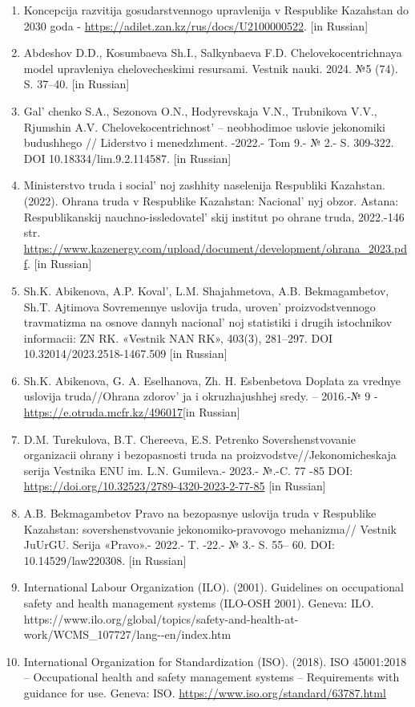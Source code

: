 \begin{enumerate}
\def\labelenumi{\arabic{enumi}.}
\item
  Koncepcija razvitija gosudarstvennogo upravlenija v Respublike
  Kazahstan do 2030 goda -
  \url{https://adilet.zan.kz/rus/docs/U2100000522}. {[}in Russian{]}
\item
  Abdeshov D.D., Kosumbaeva Sh.I., Salkynbaeva F.D.
  Chelovekocentrichnaya model upravleniya chelovecheskimi resursami.
  Vestnik nauki. 2024. №5 (74). S. 37--40. {[}in Russian{]}
\item
  Gal' chenko S.A., Sezonova O.N., Hodyrevskaja V.N.,
  Trubnikova V.V., Rjumshin A.V. Chelovekocentrichnost'{}
  -- neobhodimoe uslovie jekonomiki budushhego // Liderstvo i
  menedzhment. -2022.- Tom 9.- № 2.- S. 309-322. DOI
  10.18334/lim.9.2.114587. {[}in Russian{]}
\item
  Ministerstvo truda i social' noj zashhity naselenija
  Respubliki Kazahstan. (2022). Ohrana truda v Respublike Kazahstan:
  Nacional' nyj obzor. Astana: Respublikanskij
  nauchno-issledovatel' skij institut po ohrane truda,
  2022.-146 str.
  \url{https://www.kazenergy.com/upload/document/development/ohrana_2023.pdf}.
  {[}in Russian{]}
\item
  Sh.K. Abikenova, A.P. Koval', L.M. Shajahmetova, A.B.
  Bekmagambetov, Sh.T. Ajtimova Sovremennye uslovija truda,
  uroven'{} proizvodstvennogo travmatizma na osnove
  dannyh nacional' noj statistiki i drugih istochnikov
  informacii: ZN RK. «Vestnik NAN RK», 403(3), 281--297. DOI
  10.32014/2023.2518-1467.509 {[}in Russian{]}
\item
  Sh.K. Abikenova, G. A. Eselhanova, Zh. H. Esbenbetova Doplata za
  vrednye uslovija truda//Ohrana zdorov' ja i
  okruzhajushhej sredy. -- 2016.-№ 9 -
  \url{https://e.otruda.mcfr.kz/496017}{[}in Russian{]}
\item
  D.M. Turekulova, B.T. Chereeva, E.S. Petrenko Sovershenstvovanie
  organizacii ohrany i bezopasnosti truda na
  proizvodstve//Jekonomicheskaja serija Vestnika ENU im. L.N. Gumileva.-
  2023.- №.-C. 77 -85 DOI:
  \url{https://doi.org/10.32523/2789-4320-2023-2-77-85} {[}in Russian{]}
\item
  A.B. Bekmagambetov Pravo na bezopasnye uslovija truda v Respublike
  Kazahstan: sovershenstvovanie jekonomiko-pravovogo mehanizma// Vestnik
  JuUrGU. Serija «Pravo».- 2022.- T. -22.- № 3.- S. 55-- 60. DOI:
  10.14529/law220308. {[}in Russian{]}
\item
  International Labour Organization (ILO). (2001). Guidelines on
  occupational safety and health management systems (ILO-OSH 2001).
  Geneva: ILO.
  https://www.ilo.org/global/topics/safety-and-health-at-work/WCMS\_107727/lang-\/-en/index.htm
\item
  International Organization for Standardization (ISO). (2018). ISO
  45001:2018 -- Occupational health and safety management systems --
  Requirements with guidance for use. Geneva: ISO.
  \url{https://www.iso.org/standard/63787.html}
\end{enumerate}

